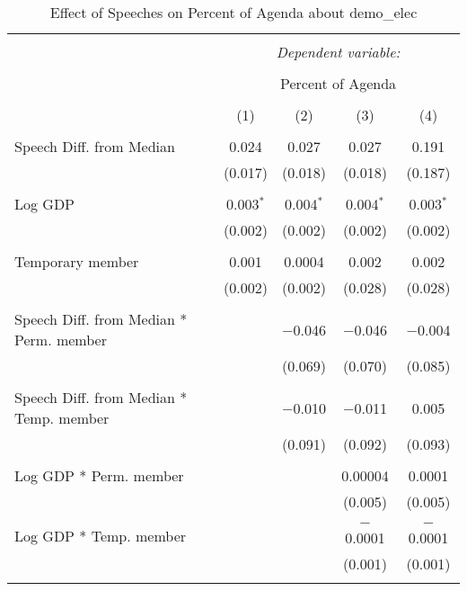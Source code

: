 
\begin{table}[!htbp] \centering 
  \caption{Effect of Speeches on Percent of Agenda about demo_elec} 
  \label{} 
\begin{tabular}{@{\extracolsep{5pt}}lcccc} 
\\[-1.8ex]\hline 
\hline \\[-1.8ex] 
 & \multicolumn{4}{c}{\textit{Dependent variable:}} \\ 
\cline{2-5} 
\\[-1.8ex] & \multicolumn{4}{c}{Percent of Agenda} \\ 
\\[-1.8ex] & (1) & (2) & (3) & (4)\\ 
\hline \\[-1.8ex] 
 Speech Diff. from Median & 0.024 & 0.027 & 0.027 & 0.191 \\ 
  & (0.017) & (0.018) & (0.018) & (0.187) \\ 
  & & & & \\ 
 Log GDP & 0.003$^{*}$ & 0.004$^{*}$ & 0.004$^{*}$ & 0.003$^{*}$ \\ 
  & (0.002) & (0.002) & (0.002) & (0.002) \\ 
  & & & & \\ 
 Temporary member & 0.001 & 0.0004 & 0.002 & 0.002 \\ 
  & (0.002) & (0.002) & (0.028) & (0.028) \\ 
  & & & & \\ 
 Speech Diff. from Median * Perm. member &  & $-$0.046 & $-$0.046 & $-$0.004 \\ 
  &  & (0.069) & (0.070) & (0.085) \\ 
  & & & & \\ 
 Speech Diff. from Median * Temp. member &  & $-$0.010 & $-$0.011 & 0.005 \\ 
  &  & (0.091) & (0.092) & (0.093) \\ 
  & & & & \\ 
 Log GDP * Perm. member &  &  & 0.00004 & 0.0001 \\ 
  &  &  & (0.005) & (0.005) \\ 
  & & & & \\ 
 Log GDP * Temp. member &  &  & $-$0.0001 & $-$0.0001 \\ 
  &  &  & (0.001) & (0.001) \\ 
  & & & & \\ 

\end{tabular}
\end{table}
